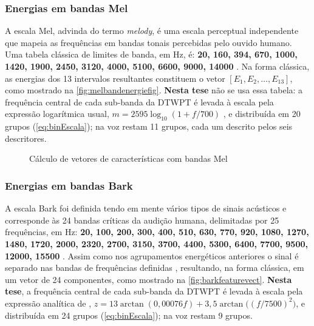 		\subsubsection{Energias em bandas Mel}
			\par A escala Mel, advinda do termo \textit{melody}, é uma escala perceptual independente que mapeia as frequências em bandas tonais percebidas pelo ouvido humano. Uma tabela clássica de limites de banda, em Hz, é: \textbf{20, 160, 394, 670, 1000, 1420, 1900, 2450, 3120, 4000, 5100, 6600, 9000, 14000} \cite{beranek1949acoustic}. Na forma clássica, as energias dos 13 intervalos resultantes constituem o vetor $[E_1, E_2, \ldots, E_{13}]$, como mostrado na \autoref{fig:melbandenergiefig}. \textbf{Nesta tese} não se usa essa tabela: a frequência central de cada sub-banda da \ac{DTWPT} é levada à escala pela expressão logarítmica usual, $m = 2595 \log_{10}(1 + f/700)$ , e distribuída em 20 grupos (\autoref{eq:binEscala}); na voz restam 11 grupos, cada um descrito pelos seis descritores.

			\begin{figure}[h]
				\centering
				\caption{Cálculo de vetores de características com bandas Mel}
				\resizebox{0.6\linewidth}{!}{}
				\label{fig:melbandenergiefig}
			\end{figure}

		\subsubsection{Energias em bandas Bark}
			\par A escala Bark foi definida tendo em mente vários tipos de sinais acústicos e corresponde às 24 bandas críticas da audição humana, delimitadas por 25 frequências, em Hz: \textbf{20, 100, 200, 300, 400, 510, 630, 770, 920, 1080, 1270, 1480, 1720, 2000, 2320, 2700, 3150, 3700, 4400, 5300, 6400, 7700, 9500, 12000, 15500} \cite{doi:10.1121-1.1908630}. Assim como nos agrupamentos energéticos anteriores o sinal é separado nas bandas de frequências definidas \cite{bosi2002introduction}, resultando, na forma clássica, em um vetor de 24 componentes, como mostrado na \autoref{fig:barkfeaturevect}. \textbf{Nesta tese}, a frequência central de cada sub-banda da \ac{DTWPT} é levada à escala pela expressão analítica de , $z = 13 \arctan(0{,}00076 f) + 3{,}5 \arctan\big((f/7500)^2\big)$, e distribuída em 24 grupos (\autoref{eq:binEscala}); na voz restam 9 grupos.

